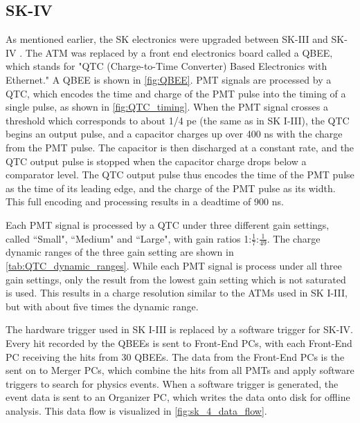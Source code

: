 \subsection{SK-IV}
\label{subsec:sk_4_daq}
As mentioned earlier, the SK electronics were upgraded between SK-III and SK-IV \cite{Yamada:2010zzc,Nishino:2009zu}.  The ATM was replaced by a front end electronics board called a QBEE, which stands for "QTC (Charge-to-Time Converter) Based Electronics with Ethernet."   A QBEE is shown in \cref{fig:QBEE}.  PMT signals are processed by a QTC, which encodes the time and charge of the PMT pulse into the timing of a single pulse, as shown in \cref{fig:QTC_timing}.  When the PMT signal crosses a threshold which corresponds to about 1/4 pe (the same as in SK I-III), the QTC begins an output pulse, and a capacitor charges up over 400 ns with the charge from the PMT pulse.  The capacitor is then discharged at a constant rate, and the QTC output pulse is stopped when the capacitor charge drops below a comparator level.  The QTC output pulse thus encodes the time of the PMT pulse as the time of its leading edge, and the charge of the PMT pulse as its width. This full encoding and processing results in a deadtime of 900 ns.\par
Each PMT signal is processed by a QTC under three different gain settings, called ``Small", ``Medium" and ``Large", with gain ratios 1:$\frac{1}{7}$:$\frac{1}{49}$.  The charge dynamic ranges of the three gain setting are shown in \cref{tab:QTC_dynamic_ranges}.  While each PMT signal is process under all three gain settings, only the result from the lowest gain setting which is not saturated is used.  This results in a charge resolution similar to the ATMs used in SK I-III, but with about five times the dynamic range.\par   
The hardware trigger used in SK I-III is replaced by a software trigger for SK-IV.  Every hit recorded by the QBEEs is sent to Front-End PCs, with each Front-End PC receiving the hits from 30 QBEEs.  The data from the Front-End PCs is the sent on to Merger PCs, which combine the hits from all PMTs and apply software triggers to search for physics events.  When a software trigger is generated, the event data is sent to an Organizer PC, which writes the data onto disk for offline analysis.  This data flow is visualized in \cref{fig:sk_4_data_flow}.\par
